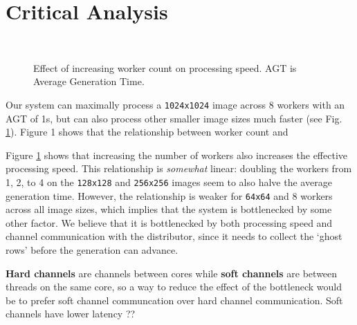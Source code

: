 \documentclass{article}
\begin{document}
    \section{Critical Analysis}
    
    \begin{figure}
        \begin{center}
             \\
            
            \hspace{1cm}
            
            \vspace*{-2mm}
        \end{center}
        \vspace{-1mm}
        \caption{Effect of increasing worker count on processing speed. AGT is Average Generation Time.}
        \label{fig:workers}
    \end{figure}

    Our system can maximally process a \verb|1024x1024| image across 8 workers with an AGT of 1s, but can also process other smaller image sizes much faster (see Fig. \ref{fig:workers}). Figure 1 shows that the relationship between worker count and 
    
    
    Figure \ref{fig:workers} shows that increasing the number of workers also increases the effective processing speed. This relationship is \textit{somewhat} linear: doubling the workers from 1, 2, to 4 on the \verb|128x128| and \verb|256x256| images seem to also halve the average generation time. However, the relationship is weaker for \verb|64x64| and 8 workers across all image sizes, which implies that the system is bottlenecked by some other factor. We believe that it is bottlenecked by both processing speed and channel communication with the distributor, since it needs to collect the `ghost rows' before the generation can advance. 

    \textbf{Hard channels} are channels between cores while \textbf{soft channels} are between threads on the same core, so a way to reduce the effect of the bottleneck would be to prefer soft channel communcation over hard channel communication. Soft channels have lower latency ??
\end{document}
